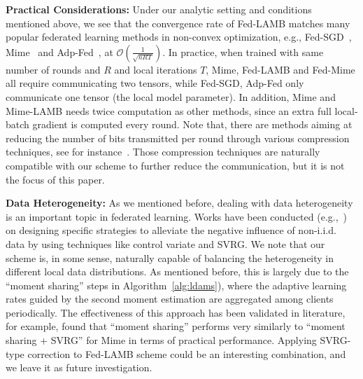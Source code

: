 \documentclass[nohyperref]{article}
\theoremstyle{plain}
\theoremstyle{definition}
\theoremstyle{remark}
\begin{document}
\noindent\textbf{Practical Considerations:} Under our analytic setting and conditions mentioned above, we see that the convergence rate of Fed-LAMB matches many popular federated learning methods in non-convex optimization, e.g., Fed-SGD~\cite{mcmahan2017communication}, Mime~\cite{karimireddy2020mime} and Adp-Fed~\cite{reddi2020adaptive}, at $\mathcal O(\frac{1}{\sqrt{nRT}})$. In practice, when trained with same number of rounds and $R$ and local iterations $T$, Mime, Fed-LAMB and Fed-Mime all require communicating two tensors, while Fed-SGD, Adp-Fed only communicate one tensor (the local model parameter). In addition, Mime and Mime-LAMB needs twice computation as other methods, since an extra full local-batch gradient is computed every round. Note that, there are methods aiming at reducing the number of bits transmitted per round through various compression techniques, see for instance~\citet{haddadpour2020fedsketch,ivkin2019communication,li2019privacy}. Those compression techniques are naturally compatible with our scheme to further reduce the communication, but it is not the focus of this paper.




\noindent\textbf{Data Heterogeneity:} As we mentioned before, dealing with data heterogeneity is an important topic in federated learning. Works have been conducted (e.g.,~\citet{karimireddy2019scaffold,karimireddy2020mime}) on designing specific strategies to alleviate the negative influence of non-i.i.d. data by using techniques like control variate and SVRG. We note that our scheme is, in some sense, naturally capable of balancing the heterogeneity in different local data distributions. 
As mentioned before, this is largely due to the ``moment sharing'' steps in Algorithm~\ref{alg:ldams}), where the adaptive learning rates guided by the second moment estimation are aggregated among clients periodically. The effectiveness of this approach has been validated in literature, for example, \citet{karimireddy2020mime} found that ``moment sharing'' performs very similarly to ``moment sharing + SVRG'' for Mime in terms of practical performance. Applying SVRG-type correction to Fed-LAMB scheme could be an interesting combination, and we leave it as future investigation.
\end{document}
